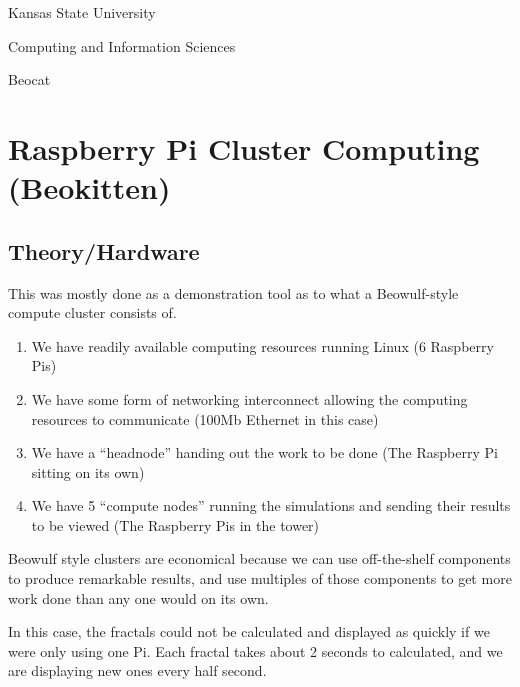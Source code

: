 \documentclass[a4paper,10pt]{article}
\begin{document}
\noindent
\begin{minipage}[t]{0.33\textwidth}
	\begin{center}
		\textcolor[RGB]{81,40,136}{Kansas State University}
	\end{center}
\end{minipage}
\begin{minipage}[t]{0.33\textwidth}
	\begin{center}
		\textcolor[RGB]{81,40,136}{Computing and Information Sciences}
	\end{center}
\end{minipage}
\begin{minipage}[t]{0.33\textwidth}
	\begin{center}
		\textcolor[RGB]{81,40,136}{Beocat}
	\end{center}
\end{minipage}

\section{Raspberry Pi Cluster Computing (Beokitten)}
\subsection{Theory/Hardware}
This was mostly done as a demonstration tool as to what a Beowulf-style compute cluster consists of.
\begin{enumerate}
\item We have readily available computing resources running Linux (6 Raspberry Pis)
\item We have some form of networking interconnect allowing the computing resources to communicate (100Mb Ethernet in this case)
\item We have a ``headnode'' handing out the work to be done (The Raspberry Pi sitting on its own)
\item We have 5 ``compute nodes'' running the simulations and sending their results to be viewed (The Raspberry Pis in the tower)
\end{enumerate}

Beowulf style clusters are economical because we can use off-the-shelf components to produce remarkable results, and use multiples of those components to get more work done than any one would on its own.

In this case, the fractals could not be calculated and displayed as quickly if we were only using one Pi.
Each fractal takes about 2 seconds to calculated, and we are displaying new ones every half second.
\end{document}
